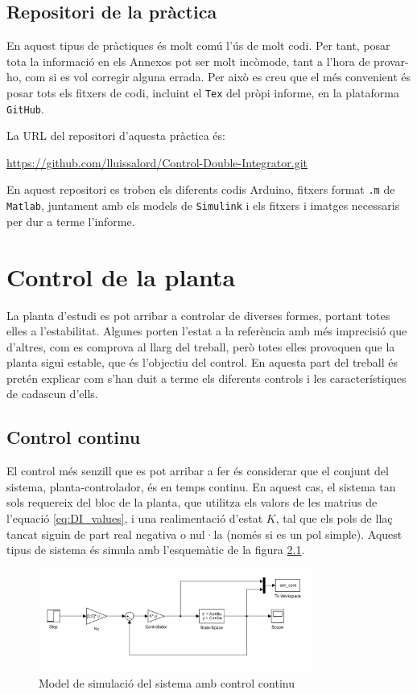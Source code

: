 \documentclass[12pt,a4paper,final,twoside,openright]{report}
\begin{document}
\section{Repositori de la pràctica}\label{sec:github}
En aquest tipus de pràctiques és molt comú l'ús de molt codi. Per tant, posar tota la informació en els Annexos pot ser molt incòmode, tant a l'hora de provar-ho, com si es vol corregir alguna errada. Per això es creu que el més convenient és posar tots els fitxers de codi, incluint el \texttt{Tex} del pròpi informe, en la plataforma \texttt{GitHub}.

La URL del repositori d'aquesta pràctica és:

\url{https://github.com/lluissalord/Control-Double-Integrator.git}

En aquest repositori es troben els diferents codis Arduino, fitxers format \texttt{.m} de \texttt{Matlab}, juntament amb els models de \texttt{Simulink} i els fitxers i imatges necessaris per dur a terme l'informe.

\chapter{Control de la planta}

La planta d'estudi es pot arribar a controlar de diverses formes, portant totes elles a l'estabilitat. Algunes porten l'estat a la referència amb més imprecisió que d'altres, com es comprova al llarg del treball, però totes elles provoquen que la planta sigui estable, que és l'objectiu del control. En aquesta part del treball és pretén explicar com s'han duit a terme els diferents controls i les característiques de cadascun d'ells.

\section{Control continu}

El control més senzill que es pot arribar a fer és considerar que el conjunt del sistema, planta-controlador, és en temps continu. En aquest cas, el sistema tan sols requereix del bloc de la planta, que utilitza els valors de les matrius de l'equació \eqref{eq:DI_values}, i una realimentació d'estat $K$, tal que els pols de llaç tancat siguin de part real negativa o nul·la (només si es un pol simple). Aquest tipus de sistema és simula amb l'esquemàtic de la figura \ref{fig:cont_scheme}.

\begin{figure}
\centering
\includegraphics[width=0.8\textwidth]{Imatges/cont_sim_scheme.pdf}
\caption{Model de simulació del sistema amb control continu\label{fig:cont_scheme}}
\end{figure}
\end{document}
